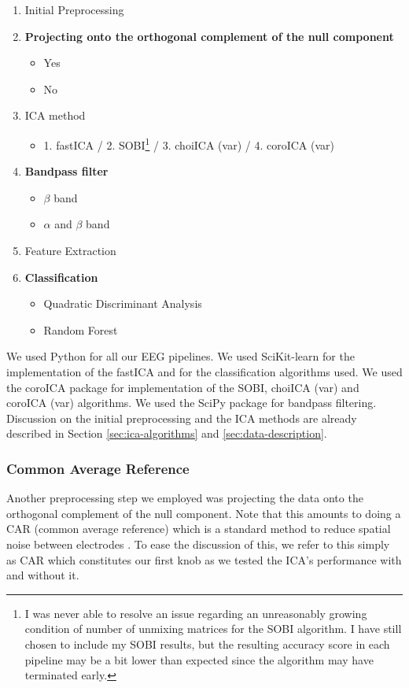 		\begin{enumerate}[noitemsep]
			\item Initial Preprocessing 
			\item \textbf{Projecting onto the orthogonal complement of the null component}
				\begin{itemize}[noitemsep]
					\item Yes
					\item No
				\end{itemize}
			\item ICA method
				\begin{itemize}[noitemsep]
					\item 1. fastICA / 2. SOBI\footnote{I was never able to resolve an issue regarding an unreasonably growing condition of number of unmixing matrices for the SOBI algorithm. I have still chosen to include my SOBI results, but the resulting accuracy score in each pipeline may be a bit lower than expected since the algorithm may have terminated early.} / 3. choiICA (var) / 4. coroICA (var) 
				\end{itemize}
			\item \textbf{Bandpass filter}
				\begin{itemize}[noitemsep]
					\item $\beta$ band
					\item $\alpha$ and $\beta$ band
				\end{itemize}
			\item Feature Extraction
			\item \textbf{Classification}
				\begin{itemize}[noitemsep]
					\item Quadratic Discriminant Analysis
					\item Random Forest
				\end{itemize}
		\end{enumerate}
	
	We used Python for all our EEG pipelines. We used SciKit-learn \cite{scikit-learn} for the implementation of the fastICA and for the classification algorithms used. We used the coroICA package \cite{pfister2019} for implementation of the SOBI, choiICA (var) and coroICA (var) algorithms. We used the SciPy package \cite{2020SciPy-NMeth} for bandpass filtering. Discussion on the initial preprocessing and the ICA methods are already described in Section \ref{sec:ica-algorithms} and \ref{sec:data-description}. 

	\subsubsection{Common Average Reference} Another preprocessing step we employed was projecting the data onto the orthogonal complement of the null component. Note that this amounts to doing a CAR (common average reference) which is a standard method to reduce spatial noise between electrodes \cite[p.176]{christoph2019}. To ease the discussion of this, we refer to this simply as CAR which constitutes our first knob as we tested the ICA's performance with and without it.

